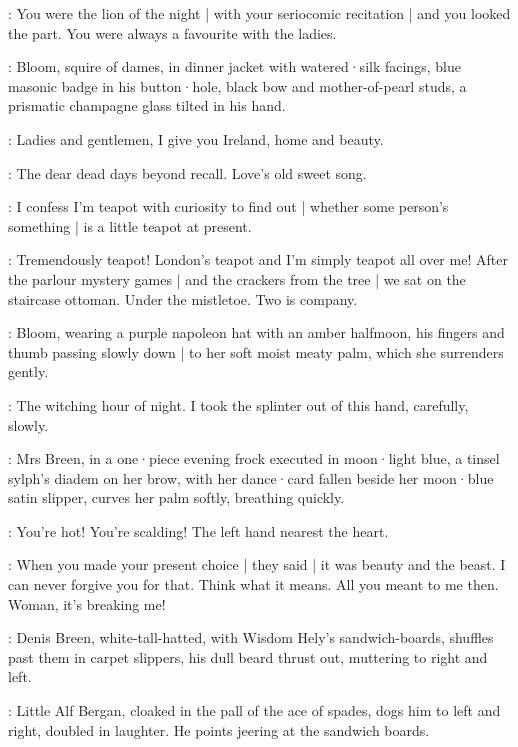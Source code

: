 \MrsBreen:
You were the lion of the night |
with your seriocomic recitation |
and you looked the part.
You were always a favourite with the ladies.

:
Bloom,
squire of dames,
in dinner jacket with watered·silk facings,
blue masonic badge in his button·hole,
black bow and mother-of-pearl studs,
a prismatic champagne glass tilted in his hand.

\Bloom:
Ladies and gentlemen,
I give you Ireland,
home and beauty.

\MrsBreen:
The dear dead days beyond recall.
Love's old sweet song.

\Bloom:
I confess I'm teapot with curiosity to find out |
whether some person's something |
is a little teapot at present.

\MrsBreen:
Tremendously teapot!
London's teapot and I'm simply teapot all over me!
After the parlour mystery games |
and the crackers from the tree |
we sat on the staircase ottoman.
Under the mistletoe.
Two is company.

:
Bloom,
wearing a purple napoleon hat with an amber halfmoon,
his fingers and thumb passing slowly down |
to her soft moist meaty palm,
which she surrenders gently.

\Bloom:
The witching hour of night.
I took the splinter out of this hand,
carefully,
slowly.

:
Mrs Breen,
in a one·piece evening frock executed in moon·light blue,
a tinsel sylph's diadem on her brow,
with her dance·card fallen beside her moon·blue satin slipper,
curves her palm softly,
breathing quickly.

\MrsBreen:
You're hot!
You're scalding!
The left hand nearest the heart.

\Bloom:
When you made your present choice |
they said |
it was beauty and the beast.
I can never forgive you for that.
Think what it means.
All you meant to me then.
Woman,
it's breaking me!

:
Denis Breen,
white-tall-hatted,
with Wisdom Hely's sandwich-boards,
shuffles past them in carpet slippers,
his dull beard thrust out,
muttering to right and left.

:
Little Alf Bergan,
cloaked in the pall of the ace of spades,
dogs him to left and right,
doubled in laughter.
He points jeering at the sandwich boards.

